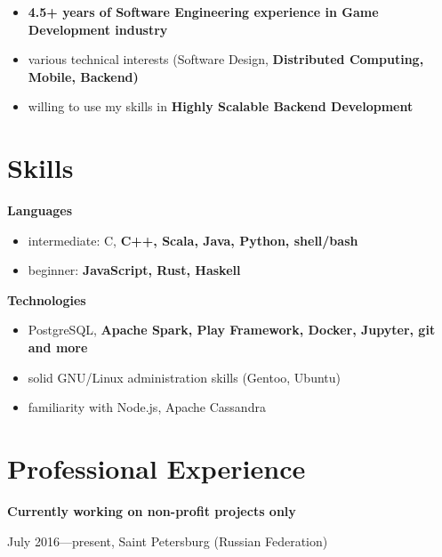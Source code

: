 \begin{itemize}[rightmargin=\dimexpr\linewidth-18cm-\leftmargin\relax]
    \item \bfseries 4.5+ years \mdseries of Software Engineering experience in Game Development industry
    \item various technical interests (Software Design, \bfseries Distributed Computing\mdseries, Mobile, \bfseries Backend\mdseries)
    \item willing to use my skills in \bfseries Highly Scalable Backend \mdseries Development
\end{itemize}

\section*{Skills}

    \bfseries Languages\mdseries
    \begin{itemize}[rightmargin=\dimexpr\linewidth-17.5cm-\leftmargin\relax]
        \item intermediate:
            C,
            \bfseries C++\mdseries,
            \bfseries Scala\mdseries,
            Java,
            Python,
            shell/bash
        \item beginner: \bfseries JavaScript\mdseries, Rust, Haskell
    \end{itemize}

    \vspace{0.4cm}
    \bfseries Technologies\mdseries
    \begin{itemize}[rightmargin=\dimexpr\linewidth-17.5cm-\leftmargin\relax]
        \item PostgreSQL, \bfseries Apache Spark\mdseries, Play Framework, \bfseries Docker\mdseries, Jupyter, git and more
        \item solid GNU/Linux administration skills (Gentoo, Ubuntu)
        \item familiarity with Node.js, Apache Cassandra
    \end{itemize}

\section*{Professional Experience}

{
\fontsize{12pt}{12pt}\selectfont
\bfseries Currently working on non-profit projects only\mdseries
}

{
\fontsize{9pt}{8pt}\selectfont
July 2016---present, Saint Petersburg (Russian Federation)
}

